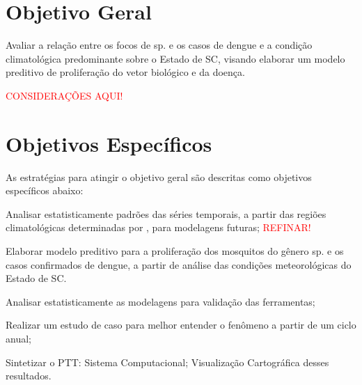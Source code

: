  \section{Objetivo Geral}
 Avaliar a relação entre os focos de  sp. e os casos de dengue e a condição climatológica predominante sobre o Estado de \acrlong{SC}, visando elaborar um modelo preditivo de proliferação do vetor biológico e da doença.

\begin{center}
\textcolor{red}{CONSIDERAÇÕES AQUI!}\\ 
\end{center}



 
\section{Objetivos Específicos}
As estratégias para atingir o objetivo geral são descritas como objetivos específicos abaixo:

\begin{alineas}
\item Analisar estatisticamente padrões das séries temporais, a partir das regiões climatológicas determinadas por , para modelagens futuras; \textcolor{red}{REFINAR!}
\item Elaborar modelo preditivo para a proliferação dos mosquitos do gênero  sp. e os casos confirmados de dengue, a partir de análise das condições meteorológicas do Estado de \acrlong{SC}.
\item Analisar estatisticamente as modelagens para validação das ferramentas;
\item Realizar um estudo de caso para melhor entender o fenômeno a partir de um ciclo anual;
\item Sintetizar o \acrfull{PTT}:
\subitem Sistema Computacional;
\subitem Visualização Cartográfica desses resultados.
\end{alineas}
